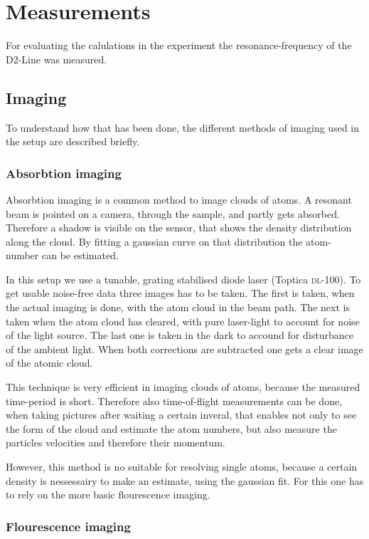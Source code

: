 \chapter{Measurements}
For evaluating the calulations in the experiment the resonance-frequency of the D2-Line was measured. 

\section{Imaging}

To understand how that has been done, the different methods of imaging used in the setup are described briefly.

\subsection{Absorbtion imaging}

Absorbtion imaging is a common method to image clouds of atoms\cite{ketterle}. A resonant beam is pointed on a camera, through the sample, and partly gets absorbed. Therefore a shadow is visible on the sensor, that shows the density distribution along the cloud. By fitting a gaussian curve on that distribution the atom-number can be estimated.

In this setup we use a tunable, grating stabilised diode laser (Toptica \textsc{dl}-100). To get usable noise-free data three images has to be taken. The first is taken, when the actual imaging is done, with the atom cloud in the beam path. The next is taken when the atom cloud has cleared, with pure laser-light to account for noise of the light source. The last one is taken in the dark to accound for disturbance of the ambient light. When both corrections are subtracted one gets a clear image of the atomic cloud.

This technique is very efficient in imaging clouds of atoms, because the measured time-period is short. Therefore also time-of-flight measurements can be done, when taking pictures after waiting a certain inveral, that enables not only to see the form of the cloud and estimate the atom numbers, but also measure the particles velocities and therefore their momentum.

However, this method is no suitable for resolving single atoms, because a certain density is nessessairy to make an estimate, using the gaussian fit. For this one has to rely on the more basic flourescence imaging.

\subsection{Flourescence imaging}


